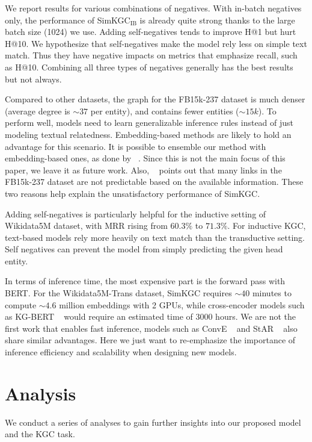 \documentclass[11pt]{article}
\begin{document}
We report results for various combinations of negatives.
With in-batch negatives only,
the performance of SimKGC$_\text{IB}$ is already quite strong
thanks to the large batch size (1024) we use.
Adding self-negatives tends to improve H@1 but hurt H@10.
We hypothesize that self-negatives make the model rely less on simple text match.
Thus they have negative impacts on metrics that emphasize recall,
such as H@10.
Combining all three types of negatives generally has the best results but not always.

Compared to other datasets,
the graph for the FB15k-237 dataset
is much denser (average degree is $\sim37$ per entity),
and contains fewer entities ($\sim15k$).
To perform well,
models need to learn generalizable inference rules
instead of just modeling textual relatedness.
Embedding-based methods are likely to hold an advantage for this scenario.
It is possible to ensemble our method with embedding-based ones,
as done by ~\citet{wang2021structure}.
Since this is not the main focus of this paper,
we leave it as future work.
Also,
~\citet{cao-etal-2021-missing} points out that
many links in the FB15k-237 dataset are not predictable based on the available information.
These two reasons help explain the unsatisfactory performance of SimKGC.

Adding self-negatives is particularly helpful for the inductive setting of Wikidata5M dataset,
with MRR rising from $60.3\%$ to $71.3\%$.
For inductive KGC,
text-based models rely more heavily on text match than the transductive setting.
Self negatives can prevent the model from simply predicting the given head entity.

In terms of inference time,
the most expensive part is the forward pass with BERT.
For the Wikidata5M-Trans dataset,
SimKGC requires $\sim40$ minutes to compute $\sim4.6$ million embeddings with 2 GPUs,
while cross-encoder models such as KG-BERT ~\citep{yao2019kg}
would require an estimated time of $3000$ hours.
We are not the first work that enables fast inference,
models such as ConvE ~\citep{dettmers2018convolutional} and StAR ~\citep{wang2021structure}
also share similar advantages.
Here we just want to re-emphasize the importance of inference efficiency and scalability
when designing new models.

\section{Analysis}
We conduct a series of analyses to gain further insights
into our proposed model and the KGC task.
\end{document}
